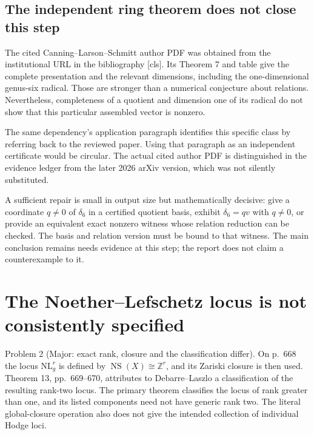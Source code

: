 \documentclass[10pt]{article}
\begin{document}
\subsection*{The independent ring theorem does not close this step}
The cited Canning–Larson–Schmitt author PDF was obtained from the institutional URL in the bibliography [cls]. Its Theorem 7 and table give the complete presentation and the relevant dimensions, including the one-dimensional genus-six radical. Those are stronger than a numerical conjecture about relations. Nevertheless, completeness of a quotient and dimension one of its radical do not show that this particular assembled vector is nonzero.\par
The same dependency’s application paragraph identifies this specific class by referring back to the reviewed paper. Using that paragraph as an independent certificate would be circular. The actual cited author PDF is distinguished in the evidence ledger from the later 2026 arXiv version, which was not silently substituted.\par
A sufficient repair is small in output size but mathematically decisive: give a coordinate \(q\ne0\) of \(\delta_6\) in a certified quotient basis, exhibit \(\delta_6=qv\) with \(q\ne0\), or provide an equivalent exact nonzero witness whose relation reduction can be checked. The basis and relation version must be bound to that witness. The main conclusion remains needs evidence at this step; the report does not claim a counterexample to it.\par
\section*{The Noether–Lefschetz locus is not consistently specified}
Problem 2 (Major: exact rank, closure and the classification differ).  On p. 668 the locus \(\mathrm{NL}_g^r\) is defined by \(\operatorname{NS}(X)\cong\mathbb Z^r\), and its Zariski closure is then used. Theorem 13, pp. 669–670, attributes to Debarre–Laszlo a classification of the resulting rank-two locus. The primary theorem classifies the locus of rank greater than one, and its listed components need not have generic rank two. The literal global-closure operation also does not give the intended collection of individual Hodge loci.\par
\end{document}
